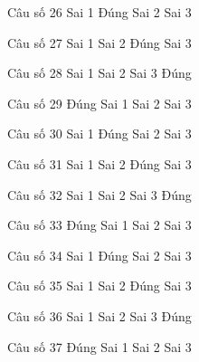 \begin{ex}
Câu số 26
\choice
{Sai 1}
{\True Đúng}
{Sai 2}
{Sai 3}
\end{ex}

\begin{ex}
Câu số 27
\choice
{Sai 1}
{Sai 2}
{\True Đúng}
{Sai 3}
\end{ex}

\begin{ex}
Câu số 28
\choice
{Sai 1}
{Sai 2}
{Sai 3}
{\True Đúng}
\end{ex}
\begin{ex}
Câu số 29
\choice
{\True Đúng}
{Sai 1}
{Sai 2}
{Sai 3}
\end{ex}

\begin{ex}
Câu số 30
\choice
{Sai 1}
{\True Đúng}
{Sai 2}
{Sai 3}
\end{ex}

\begin{ex}
Câu số 31
\choice
{Sai 1}
{Sai 2}
{\True Đúng}
{Sai 3}
\end{ex}

\begin{ex}
Câu số 32
\choice
{Sai 1}
{Sai 2}
{Sai 3}
{\True Đúng}
\end{ex}
\begin{ex}
Câu số 33
\choice
{\True Đúng}
{Sai 1}
{Sai 2}
{Sai 3}
\end{ex}

\begin{ex}
Câu số 34
\choice
{Sai 1}
{\True Đúng}
{Sai 2}
{Sai 3}
\end{ex}

\begin{ex}
Câu số 35
\choice
{Sai 1}
{Sai 2}
{\True Đúng}
{Sai 3}
\end{ex}

\begin{ex}
Câu số 36
\choice
{Sai 1}
{Sai 2}
{Sai 3}
{\True Đúng}
\end{ex}
\begin{ex}
Câu số 37
\choice
{\True Đúng}
{Sai 1}
{Sai 2}
{Sai 3}
\end{ex}

